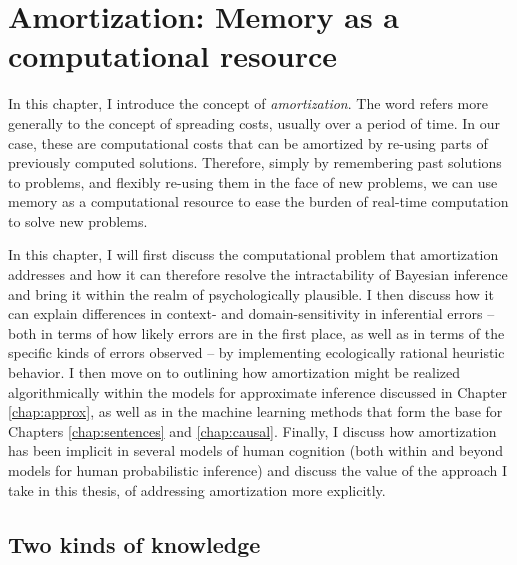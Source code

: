 \chapter{Amortization: Memory as a computational resource}
\label{chap:amort}


In this chapter, I introduce the concept of \textit{amortization}. The word refers more generally to the concept of spreading costs, usually over a period of time. In our case, these are computational costs that can be amortized by re-using parts of previously computed solutions. Therefore, simply by remembering past solutions to problems, and flexibly re-using them in the face of new problems, we can use memory as a computational resource to ease the burden of real-time computation to solve new problems. 

In this chapter, I will first discuss the computational problem that amortization addresses and how it can therefore resolve the intractability of Bayesian inference and bring it within the realm of psychologically plausible. I then discuss how it can explain differences in context- and domain-sensitivity in inferential errors -- both in terms of how likely errors are in the first place, as well as in terms of the specific kinds of errors observed -- by implementing ecologically rational heuristic behavior. I then move on to outlining how amortization might be realized algorithmically within the models for approximate inference discussed in Chapter \ref{chap:approx}, as well as in the machine learning methods that form the base for Chapters \ref{chap:sentences} and \ref{chap:causal}. Finally, I discuss how amortization has been implicit in several models of human cognition (both within and beyond models for human probabilistic inference) and discuss the value of the approach I take in this thesis, of addressing amortization more explicitly.

\section{Two kinds of knowledge}

